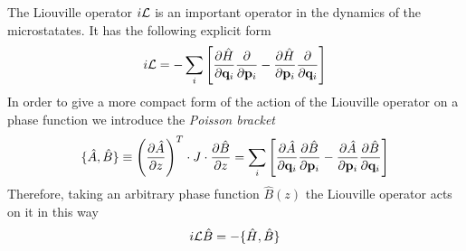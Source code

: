 \documentclass[b5paper,openright,10pt]{book}
\begin{document}
The Liouville operator $i{\cal L}$ is an important operator in the dynamics of the microstatates. It has the following explicit form 
\begin{equation}
    i{\cal L} = -
    \sum_i\left[\frac{\partial \hat{H}}{\partial {\bf q}_i}
\frac{\partial    }{\partial {\bf p}_i}-
\frac{\partial \hat{H}}{\partial {\bf p}_i}
\frac{\partial }{\partial {\bf q}_i}\right]
\label{iL}
\end{equation}
In order to give a more compact form of the action of the Liouville operator on a phase function we introduce the {\it Poisson bracket}
\begin{align}
  \{\hat{A},\hat{B}\}\equiv\left(\frac{\partial\hat{A}}{\partial z}\right)^T\cdot J\cdot\frac{\partial\hat{B}}{\partial z}= 
  \sum_i\left[\frac{\partial \hat{A}}{\partial {\bf q}_i}
    \frac{\partial \hat{B}}{\partial {\bf p}_i}-          
    \frac{\partial \hat{A}}{\partial {\bf p}_i}
  \frac{\partial\hat{B} }{\partial {\bf q}_i}\right]
    \label{PoissonBracket}
\end{align}
Therefore, taking an arbitrary phase function $\hat{B}(z)$ the Liouville operator acts on it in this way
\begin{equation}
  i{\cal L}\hat{B} 
  = -\{\hat{H},\hat{B}\}
\label{iL}
\end{equation}

\end{document}
